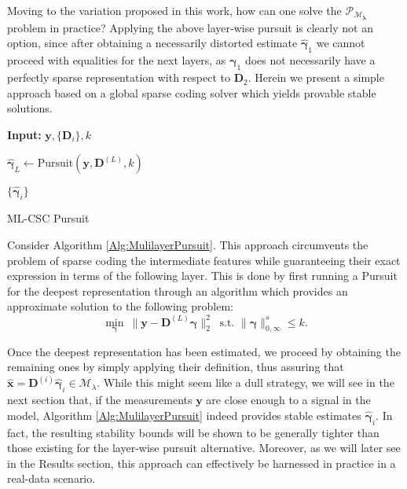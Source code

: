 \documentclass[10pt,journal]{IEEEtran}
\def\x{{\mathbf x}}
\def\y{{\mathbf y}}
\def\D{{\mathbf D}}
\def\M{{\mathcal{M}}}
\def\P{{\mathcal{P}}}
\def\gama{{\boldsymbol \gamma}}
\def\lamda{{\boldsymbol \lambda}}
\def\Loi{{\ell_{0,\infty}}}
\def\PM{{\P_{\M_\lamda}}}
\theoremstyle{plain}
\theoremstyle{definition}
\begin{document}
Moving to the variation proposed in this work, how can one solve the $\PM$ problem in practice? Applying the above layer-wise pursuit is clearly not an option, since after obtaining a necessarily distorted estimate $\hat{\gama}_1$ we cannot proceed with equalities for the next layers, as $\gama_1$ does not necessarily have a perfectly sparse representation with respect to $\D_2$. Herein we present a simple approach based on a global sparse coding solver which yields provable stable solutions. 
\begin{algorithm}[h]
	\textbf{Input:} $\y,\{\D_i\},k$\;

	$\hat{\gama}_L \leftarrow \text{Pursuit}(\y,\D^{(L)},k) $\;
	
	\For{$j = L,\dots,1$}{
		$\hat{\gama}_{j-1} \leftarrow \D_j\hat{\gama}_j $
		}

	\Return $\{\hat{\gama}_i\}$\;
	\caption{ML-CSC Pursuit}
	\label{Alg:MulilayerPursuit}
\end{algorithm}

Consider Algorithm \ref{Alg:MulilayerPursuit}. This approach circumvents the problem of sparse coding the intermediate features while guaranteeing their exact expression in terms of the following layer. This is done by first running a Pursuit for the deepest representation through an algorithm which provides an approximate solution to the following problem:
\begin{equation}\label{eq:PursuitDeepest}
	\underset{\gama}{\min}\ \|\y - \D^{(L)} \gama \|_2^2\ \text{ s.t. } \|\gama\|^s_{0,\infty} \leq k.
\end{equation}

Once the deepest representation has been estimated, we proceed by obtaining the remaining ones by simply applying their definition, thus assuring that $\hat{\x} = \D^{(i)}\hat{\gama}_i \in \M_\lambda$. While this might seem like a dull strategy, we will see in the next section that, if the measurements $\y$ are close enough to a signal in the model, Algorithm \ref{Alg:MulilayerPursuit} indeed provides stable estimates $\hat{\gama}_i$. In fact, the resulting stability bounds will be shown to be generally tighter than those existing for the layer-wise pursuit alternative. Moreover, as we will later see in the Results section, this approach can effectively be harnessed in practice in a real-data scenario. 
\end{document}
